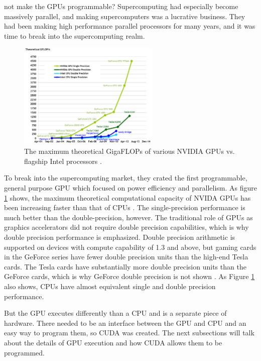 not make the GPUs programmable?  Supercomputing had especially become massively parallel, and making supercomputers was a lucrative business.  They had been making high performance parallel processors for many years, and it was time to break into the supercomputing realm.

\begin{figure}[h!] 
  \centering
    \includegraphics[width=0.6\textwidth]{graphics/computational_cap.pdf}
     \caption{The maximum theoretical GigaFLOPs of various NVIDIA GPUs vs. flagship Intel processors \cite{cuda}. \label{computational_cap}}
\end{figure}

To break into the supercomputing market, they crated the first programmable, general purpose GPU which focused on power efficiency and parallelism.  As figure \ref{computational_cap} shows, the maximum theoretical computational capacity of NVIDA GPUs has been increasing faster than that of CPUs \cite{cuda}.  The single-precision performance is much better than the double-precision, however.  The traditional role of GPUs as graphics accelerators did not require double precision capabilities, which is why double precision performance is emphasized.  Double precision arithmetic is supported on devices with compute capability of 1.3 and above, but gaming cards in the GeForce series have fewer double precision units than the high-end Tesla cards.  The Tesla cards have substantially more double precision units than the GeForce cards, which is why GeForce double precision is not shown \cite{fermi}.  As Figure \ref{computational_cap} also shows, CPUs have almost equivalent single and double precision performance. 

But the GPU executes differently than a CPU and is a separate piece of hardware.  There needed to be an interface between the GPU and CPU and an easy way to program them, so CUDA was created.  The next subsections will talk about the details of GPU execution and how CUDA allows them to be programmed. 

